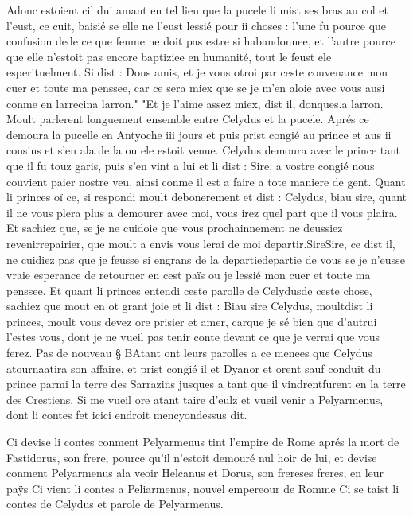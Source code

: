 \documentclass{article}
\begin{document}
\begin{pages}
   Adonc estoient cil dui amant en tel lieu que la pucele li mist ses bras au col et l’eust, 
   ce cuit, baisié se elle ne l’eust lessié pour ii choses : l’une fu pource que confusion 
   dede ce que fenme ne doit pas estre 
   si habandonnee, et l’autre pource que elle n’estoit pas encore baptiziee en humanité, tout le feust ele esperituelment. Si dist :
   Dous amis, et je vous otroi par ceste couvenance mon cuer et toute ma penssee, 
      car ce sera miex que se je m’en aloie avec vous ausi conme 
      en larrecina larron." "Et je l'aime assez miex, dist il, donques.a larron. \pend
\pstart Moult parlerent longuement ensemble 
   entre Celydus et 
   la pucele. Aprés ce demoura la pucelle en 
   Antyoche iii jours et puis prist congié au prince 
   et aus ii cousins et s’en ala de la ou ele estoit venue. Celydus demoura avec 
   le prince tant que il fu touz garis, puis s’en vint a lui et li dist :
   Sire, a vostre congié nous couvient paier nostre veu, ainsi conme il est a faire a tote maniere 
      de gent.
   Quant li princes oï ce, si respondi moult debonerement et dist :
   Celydus, biau sire, quant il ne vous plera plus a demourer 
      avec moi, vous irez quel part que il vous plaira. Et sachiez que, se je ne cuidoie que vous prochainnement ne deussiez 
      revenirrepairier, que moult a envis vous lerai de moi departir.SireSire, 
      ce dist il, ne cuidiez pas que 
      je feusse si engrans de la departiedepartie de vous se je n’eusse 
      vraie esperance de retourner en cest païs ou je lessié mon cuer et toute ma penssee.
   Et quant li princes 
   entendi ceste parolle de Celydusde ceste chose, 
   sachiez que mout en ot grant joie et 
   li dist :
   Biau sire Celydus, 
      moultdist li princes, moult 
      vous devez ore prisier et amer, carque je sé bien que d’autrui 
      l’estes vous, dont je ne vueil pas tenir conte devant ce que je verrai que vous ferez. \pend
\pstart Pas de nouveau § BAtant ont leurs parolles a ce menees que 
   Celydus atournaatira son affaire, 
   et prist congié il et Dyanor et orent sauf conduit du prince 
   parmi la terre des Sarrazins jusques a tant que il 
      vindrentfurent en la terre des Crestiens. 
   Si me vueil ore atant taire d’eulz et 
      vueil venir a 
   Pelyarmenus, 
   dont li contes fet 
      icici endroit mencyondessus dit. \pend
         
         
            Ci devise li contes 
               conment Pelyarmenus
               tint l’empire de Rome aprés la mort de Fastidorus, 
               son frere, pource qu’il n’estoit demouré nul hoir de lui, 
               et devise 
               conment Pelyarmenus ala veoir Helcanus 
               et Dorus, son frereses freres, 
               en leur paÿs
               Ci vient li contes a Peliarmenus, nouvel empereour de Romme
               Ci se taist li contes de Celydus et parole de Pelyarmenus.
            

\end{pages}
\end{document}
